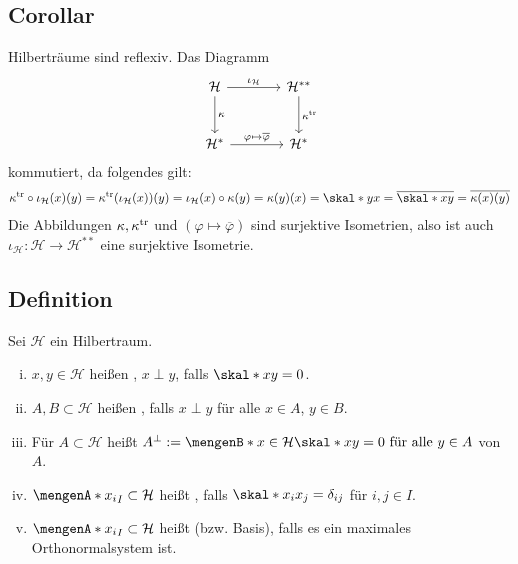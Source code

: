\subsection[Corollar: Hilberträume sind reflexiv]{Corollar} %
\label{sub:712}
Hilberträume sind reflexiv.
Das Diagramm
\[
	\begin{tikzcd}[row sep=large, column sep=large]
		\mathcal{H} \rar["\iota_{\mathcal{H}}"] \dar["\kappa"] & \mathcal{H}^{**} \dar["\kappa^\tr"]\\
		\mathcal{H}^* \rar["\varphi \mapsto \overline{\varphi}"] & \mathcal{H}^*
	\end{tikzcd}
\]
kommutiert, da folgendes gilt:
\begin{align*}
	\kappa^\tr \circ \iota_{\mathcal{H}}(x)(y) = \kappa^\tr \enbrace*{\iota_{\mathcal{H}}(x)}(y)  =\iota_{\mathcal{H}}(x) \circ \kappa (y) 
	= \kappa(y)(x) = \skal*{y}{x} = \overline{\skal*{x}{y}} = \overline{\kappa(x)(y)} 
\end{align*}
Die Abbildungen $\kappa, \kappa^{\mathrm{tr}}$ und $(\varphi \mapsto \overline{\varphi})$ sind surjektive Isometrien, also ist auch 
$\iota_{\mathcal{H}} \colon \mathcal{H} \to \mathcal{H}^{**}$ eine surjektive Isometrie.\bewende

\subsection[Definition: Orthogonal, Orthonormalsystem und Hilbertraumbasis]{Definition} %
\label{sub:713}
Sei $\mathcal{H}$ ein Hilbertraum.
\begin{enumerate}[(i)]
	\item $x,y \in \mathcal{H}$ heißen , $x\perp y$, falls $\skal*{x}{y}=0$.
	\item $A,B  \subset \mathcal{H}$ heißen , falls $x \perp y$ für alle $x \in A$, $y \in B$. 
	\item Für $A \subset \mathcal{H}$ heißt $A^\bot := \set[x \in \mathcal{H}]{\skal*{x}{y}=0 \text{ für alle } y \in A}$  von $A$.
	\item $\set{x_i}_{I} \subset \mathcal{H}$ heißt , falls $\skal*{x_i}{x_j}= \delta_{ij}$ für $i,j \in I$.
	\item $\set{x_i}_{I} \subset \mathcal{H}$ heißt  (bzw. Basis), falls es ein maximales Orthonormalsystem ist. 
\end{enumerate}

